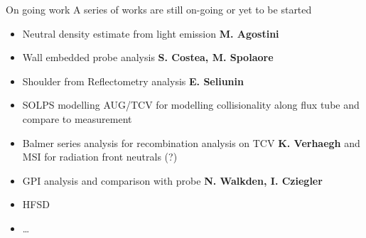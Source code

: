 \documentclass[10pt, compress]{beamer}
\begin{document}
\begin{frame}{On going work}
  A series of works are still on-going \textcolor{ta3scarletred}{or
    yet to be started}
  \begin{itemize}[<+->]
    \item Neutral density estimate from light emission
      \textbf{M. Agostini}
    \item Wall embedded probe analysis \textbf{S. Costea,
        M. Spolaore}
    \item Shoulder from Reflectometry analysis \textbf{E. Seliunin}
    \item \textcolor{ta3scarletred}{SOLPS modelling AUG/TCV for modelling collisionality
      along flux tube and compare to measurement}
    \item \textcolor{ta3scarletred}{Balmer series analysis for
        recombination analysis on TCV \textbf{K. Verhaegh} and MSI for
      radiation front neutrals (?)}
    \item \textcolor{ta3orange}{GPI analysis and comparison with probe
      \textbf{N. Walkden, I. Cziegler}}  
  \item \textcolor{ta3scarletred}{HFSD}
    \item \textcolor{ta3scarletred}{\ldots}
  \end{itemize}
\end{frame}
\end{document}
